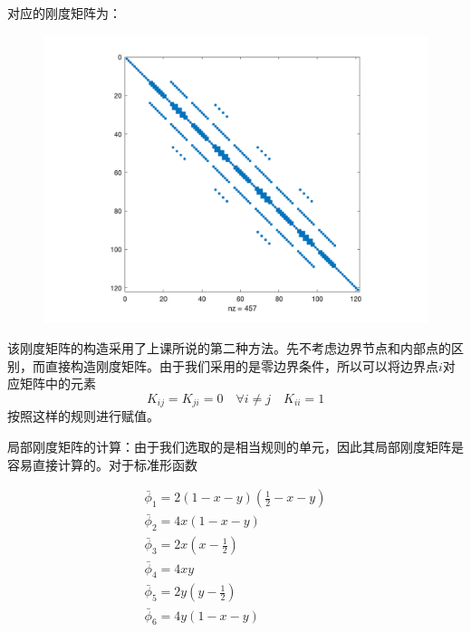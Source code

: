 \documentclass{ctexart}
\begin{document}
对应的刚度矩阵为：
\begin{figure}[H]
  \centering
  \includegraphics[width=0.65\linewidth]{./matrix.png}
\end{figure}

该刚度矩阵的构造采用了上课所说的第二种方法。先不考虑边界节点和内部点的区别，而直接构造刚度矩阵。由于我们采用的是零边界条件，所以可以将边界点$i$对应矩阵中的元素
\begin{equation}
  K_{i j} = K_{j i} = 0 \quad \forall i \ne j\quad K_{i i} = 1
\end{equation}
按照这样的规则进行赋值。

局部刚度矩阵的计算：由于我们选取的是相当规则的单元，因此其局部刚度矩阵是容易直接计算的。对于标准形函数

\begin{eqnarray}
  \bar \phi_1 = 2(1-x-y)(\frac{1}{2}-x-y)\\
  \bar \phi_2 = 4x(1-x-y)\\
  \bar \phi_3 = 2x(x-\frac{1}{2})\\
  \bar \phi_4 = 4xy\\
  \bar \phi_5 = 2y(y-\frac{1}{2})\\
  \bar \phi_6 = 4y(1-x-y)
\end{eqnarray}
\end{document}
